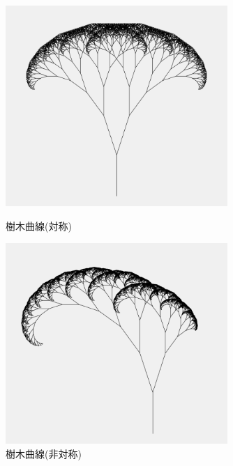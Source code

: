 \documentclass[dvipdfmx]{jsarticle}
\theoremstyle{definition}
\begin{document}
\begin{figure}[H]
    \begin{minipage}{0.5\hsize}
        \centering
        \includegraphics[width=0.75\textwidth]{figure/others/tree/tree_curve.png}
        \caption{樹木曲線(対称)}
    \end{minipage}
    \begin{minipage}{0.49\hsize}
        \centering
        \includegraphics[width=0.75\textwidth]{figure/others/tree/tree_curve_asy.png}
        \caption{樹木曲線(非対称)}
    \end{minipage}
\end{figure}
\end{document}
